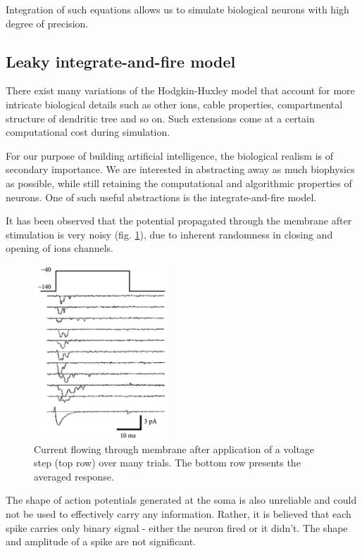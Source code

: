 \documentclass[oneside,english,logo]{amuthesis}
\begin{document}
Integration of such equations allows us to simulate biological neurons with high degree of precision.

\subsection{Leaky integrate-and-fire model}

There exist many variations of the Hodgkin-Huxley model that account for more intricate biological details such as other ions, cable properties, compartmental structure of dendritic tree and so on. Such extensions come at a certain computational cost during simulation.

For our purpose of building artificial intelligence, the biological realism is of secondary importance. We are interested in abstracting away as much biophysics as possible, while still retaining the computational and algorithmic properties of neurons. One of such useful abstractions is the integrate-and-fire model.

It has been observed that the potential propagated through the membrane after stimulation is very noisy \cite{neuronal_dynamics} (fig. \ref{fig:membrane_potential_spike}), due to inherent randomness in closing and opening of ions channels. 
\begin{figure}[!htbp]
	\centering
	\includegraphics[width=5cm]{membrane_potential_spike}
	\caption{Current flowing through membrane after application of a voltage step (top row) over many trials. The bottom row presents the averaged response.}
	\label{fig:membrane_potential_spike}
\end{figure} 
The shape of action potentials generated at the soma is also unreliable and could not be used to effectively carry any information. Rather, it is believed that each spike carries only binary signal - either the neuron fired or it didn't. The shape and amplitude of a spike are not significant.
\end{document}
